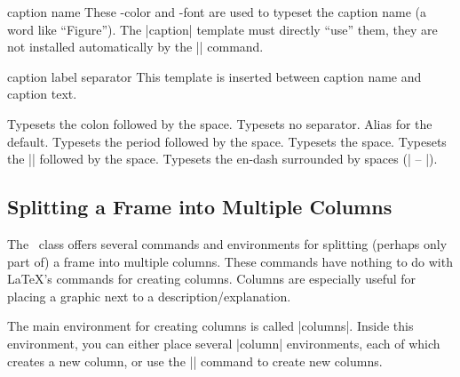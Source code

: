 \begin{element}{caption name}\no\yes\yes
  These \beamer-color and -font are used to typeset the caption name (a word like ``Figure''). The |caption| template must directly ``use'' them, they are not installed automatically by the |\insertcaptionname| command.
\end{element}

\begin{element}{caption label separator}\yes\no\no
  This template is inserted between caption name and caption text.
  \begin{templateoptions}
    Typesets the colon followed by the space.
    Typesets no separator.
    Alias for the default.
    Typesets the period followed by the space.
    Typesets the space.
    Typesets the |\quad| followed by the space.
    Typesets the en-dash surrounded by spaces (| -- |).
  \end{templateoptions}
\end{element}


\subsection{Splitting a Frame into Multiple Columns}

The \beamer\ class offers several commands and environments for splitting (perhaps only part of) a frame into multiple columns. These commands have nothing to do with \LaTeX's commands for creating columns. Columns are especially useful for placing a graphic next to a description/explanation.

The main environment for creating columns is called |columns|. Inside this environment, you can either place several |column| environments, each of which creates a new column, or use the |\column| command to create new columns.

